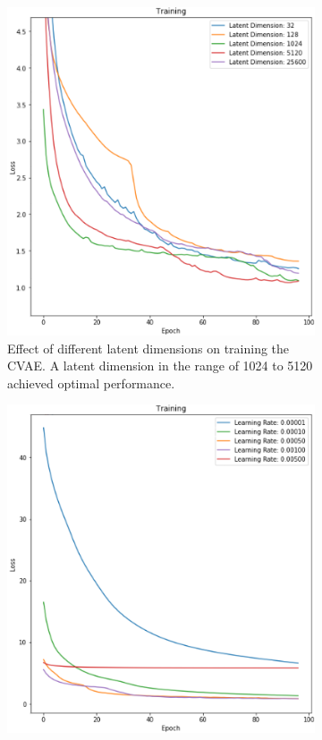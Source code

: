 \documentclass{l4proj}
\begin{document}
\begin{figure}[H]
    \centering
    \begin{subfigure}[t]{0.48\textwidth}
        \includegraphics[width=\textwidth]{images/VAELatentDimensions.png}
        \caption{Effect of different latent dimensions on training the CVAE. A latent dimension in the range of 1024 to 5120 achieved optimal performance.}
        \label{fig:vae_latent_dim}
    \end{subfigure}
    \quad
    \begin{subfigure}[t]{0.48\textwidth}
        \includegraphics[width=\textwidth]{images/VAELearningRates.png}

\end{subfigure}
\end{figure}
\end{document}
